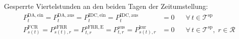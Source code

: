 Gesperrte Viertelstunden an den beiden Tagen der Zeitumstellung:
\begin{align}
    P^{\mathrm{DA,ein}}_t = P^{\mathrm{DA,aus}}_t = P^{\mathrm{IDC,ein}}_t = P^{\mathrm{IDC,aus}}_t &= 0 && \forall\, t \in \mathcal{T}^{\mathrm{sp}} \label{eq:anh:modell:gesperrt}\\
    P^{\mathrm{FCR}}_{s(t)} = P^{\mathrm{aFRR}}_{s(t),r} = P^{\mathrm{aFRR,E}}_{t,r} = P^{\mathrm{aus}}_{t,r} = P^{\mathrm{kur}}_{s(t),r} &= 0 && \forall\, t \in \mathcal{T}^{\mathrm{sp}}, \; r \in \mathcal{R} \label{eq:anh:modell:gesperrt_b}
\end{align}

